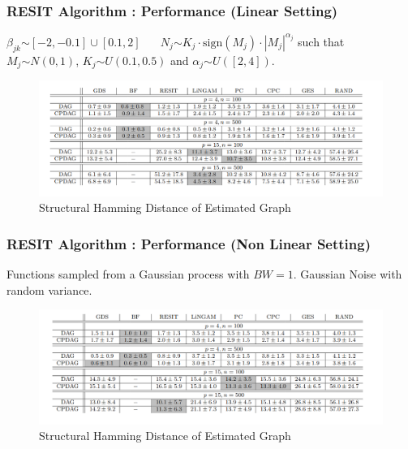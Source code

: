 \documentclass{beamer}
\begin{document}
\begin{frame}
\frametitle{RESIT Algorithm : Performance (Linear Setting)}
\begin{center}
\scriptsize{$\beta_{jk} \stackrel{}{\sim} [-2,-0.1] \cup [0.1,2]$
$\;\;\;\;\;N_j \stackrel{}{\sim} K_j \cdot \mathrm{sign}(M_j)\cdot |M_j|^{\alpha_j}$
such that
$M_j \stackrel{}{\sim} N(0,1)$, $K_j \stackrel{}{\sim} U(0.1,0.5)$ 
and
$\alpha_j \stackrel{}{\sim} U([2,4])$. }
\end{center}
\begin{figure}[h!]
	\centering
	\includegraphics[scale=0.28]{linear.png}
	\caption{Structural Hamming Distance of Estimated Graph}
\end{figure}
\end{frame}

\begin{frame}
\frametitle{RESIT Algorithm : Performance (Non Linear Setting)}
\begin{center}
	\scriptsize{
		Functions sampled from a Gaussian process with $BW=1$. Gaussian Noise with random variance.
	}
\end{center}
\begin{figure}[h!]
	\centering
	\includegraphics[scale=0.28]{dif.png}
	\caption{Structural Hamming Distance of Estimated Graph}
\end{figure}
\end{frame}
\end{document}

